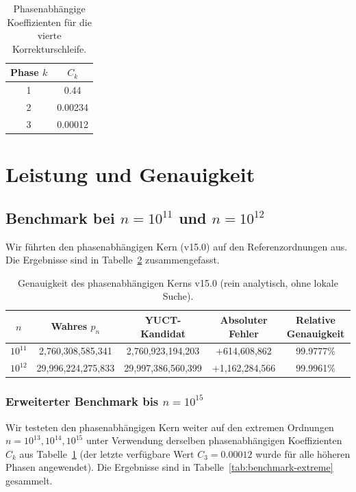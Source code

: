 \documentclass[11pt,a4paper]{article}
\begin{document}
	\begin{table}[htbp]
		\centering
		\caption{Phasenabhängige Koeffizienten für die vierte Korrekturschleife.}
		\label{tab:phase-coeffs}
		\begin{tabular}{c c}
			\toprule
			Phase \(k\) & \(C_k\) \\
			\midrule
			1 & 0.44 \\
			2 & 0.00234 \\
			3 & 0.00012 \\
			\bottomrule
		\end{tabular}
	\end{table}
	
	\section{Leistung und Genauigkeit}
	\label{sec:performance}
	\subsection{Benchmark bei \(n=10^{11}\) und \(n=10^{12}\)}
	Wir führten den phasenabhängigen Kern (v15.0) auf den Referenzordnungen aus. Die Ergebnisse sind in Tabelle~\ref{tab:benchmark-v15} zusammengefasst.
	
	\begin{table}[htbp]
		\centering
		\caption{Genauigkeit des phasenabhängigen Kerns v15.0 (rein analytisch, ohne lokale Suche).}
		\label{tab:benchmark-v15}
		\begin{tabular}{c c c c c}
			\toprule
			\(n\) & Wahres \(p_n\) & YUCT-Kandidat & Absoluter Fehler & Relative Genauigkeit \\
			\midrule
			\(10^{11}\) & 2,760,308,585,341 & 2,760,923,194,203 & +614,608,862 & 99.9777\% \\
			\(10^{12}\) & 29,996,224,275,833 & 29,997,386,560,399 & +1,162,284,566 & 99.9961\% \\
			\bottomrule
		\end{tabular}
	\end{table}
	
	\subsubsection{Erweiterter Benchmark bis \(n=10^{15}\)}
	
	Wir testeten den phasenabhängigen Kern weiter auf den extremen Ordnungen
	\(n = 10^{13}, 10^{14}, 10^{15}\) unter Verwendung derselben phasenabhängigen
	Koeffizienten \(C_k\) aus Tabelle~\ref{tab:phase-coeffs} (der letzte verfügbare
	Wert \(C_3 = 0.00012\) wurde für alle höheren Phasen angewendet).
	Die Ergebnisse sind in Tabelle~\ref{tab:benchmark-extreme} gesammelt.
	
\end{document}

